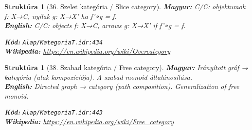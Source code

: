 \documentclass[11pt,a4paper,twocolumn]{article}
\newtheorem{struktura}[tetel]{Struktúra}
\begin{document}
\begin{struktura}[36. Szelet kategória / Slice category]

\textbf{Magyar:} C/C: objektumok f: X→C, nyilak g: X→X' ha f'∘g = f.\\

\textbf{English:} C/C: objects f: X→C, arrows g: X→X' if f'∘g = f.\\

\begin{center}
\end{center}

\textbf{Kód:} \texttt{Alap/KategoriaT.idr:434}\\
\textbf{Wikipedia:} \url{https://en.wikipedia.org/wiki/Overcategory}

\end{struktura}

\vspace{0.5cm}

\begin{struktura}[38. Szabad kategória / Free category]

\textbf{Magyar:} Irányított gráf → kategória (utak kompozíciója). A szabad monoid általánosítása.\\

\textbf{English:} Directed graph → category (path composition). Generalization of free monoid.\\

\begin{center}
\end{center}

\textbf{Kód:} \texttt{Alap/KategoriaT.idr:443}\\
\textbf{Wikipedia:} \url{https://en.wikipedia.org/wiki/Free_category}

\end{struktura}

\vspace{0.5cm}
\end{document}
